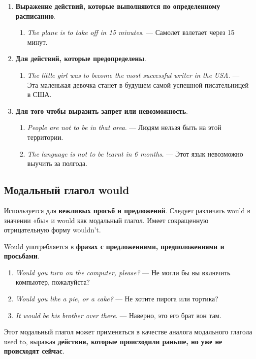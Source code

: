 \documentclass{article}
\begin{document}
\begin{enumerate}
	\item \textbf{Выражение действий, которые выполняются по определенному расписанию}.
	\begin{enumerate}
		\item \emph{The plane is to take off in 15 minutes}. — Самолет взлетает через 15 минут. 
	\end{enumerate}
	\item \textbf{Для действий, которые предопределены}.
	\begin{enumerate}
		\item \emph{The little girl was to become the most successful writer in the USA}. — Эта маленькая девочка станет в будущем самой успешной писательницей в США. 
	\end{enumerate}
	\item \textbf{Для того чтобы выразить запрет или невозможность}.
	\begin{enumerate}
		\item \emph{People are not to be in that area}. — Людям нельзя быть на этой территории.
		\item \emph{The language is not to be learnt in 6 months}. — Этот язык невозможно выучить за полгода. 
	\end{enumerate}
\end{enumerate}

\subsection{Модальный глагол \textbf{would}}

Используется для \textbf{вежливых просьб и предложений}. Следует различать would в значении «бы» и would как модальный глагол. Имеет сокращенную отрицательную форму wouldn’t.

Would употребляется в \textbf{фразах с предложениями, предположениями и просьбами}. 

\begin{enumerate}
	\item \emph{Would you turn on the computer, please?} — Не могли бы вы включить компьютер, пожалуйста?
	\item \emph{Would you like a pie, or a cake?} — Не хотите пирога или тортика? 
	\item \emph{It would be his brother over there}. — Наверно, это его брат вон там. 
\end{enumerate}

Этот модальный глагол может применяться в качестве аналога модального глагола used to, выражая \textbf{действия, которые происходили раньше, но уже не происходят сейчас}. 
\end{document}
